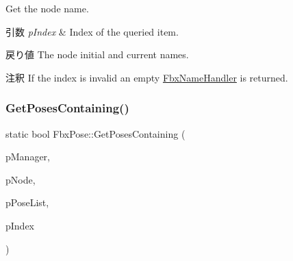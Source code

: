 Get the node name. 
\begin{DoxyParams}{引数}
{\em p\+Index} & Index of the queried item. \\
\hline
\end{DoxyParams}
\begin{DoxyReturn}{戻り値}
The node initial and current names. 
\end{DoxyReturn}
\begin{DoxyRemark}{注釈}
If the index is invalid an empty \hyperlink{class_fbx_name_handler}{Fbx\+Name\+Handler} is returned. 
\end{DoxyRemark}
\mbox{\label{class_fbx_pose_a7a312148d8ba4b20243b20152d809b3f}} 
\subsubsection{\texorpdfstring{Get\+Poses\+Containing()}{GetPosesContaining()}\hspace{0.1cm}{\footnotesize\ttfamily [1/2]}}
{\footnotesize\ttfamily static bool Fbx\+Pose\+::\+Get\+Poses\+Containing (\begin{DoxyParamCaption}\item[{\hyperlink{class_fbx_manager}{Fbx\+Manager} \&}]{p\+Manager,  }\item[{\hyperlink{class_fbx_node}{Fbx\+Node} $\ast$}]{p\+Node,  }\item[{\hyperlink{fbxpose_8h_ad68863a9c2ab60c2210bb3dff02a680a}{Pose\+List} \&}]{p\+Pose\+List,  }\item[{\hyperlink{class_fbx_array}{Fbx\+Array}$<$ int $>$ \&}]{p\+Index }\end{DoxyParamCaption})\hspace{0.3cm}{\ttfamily [static]}}

